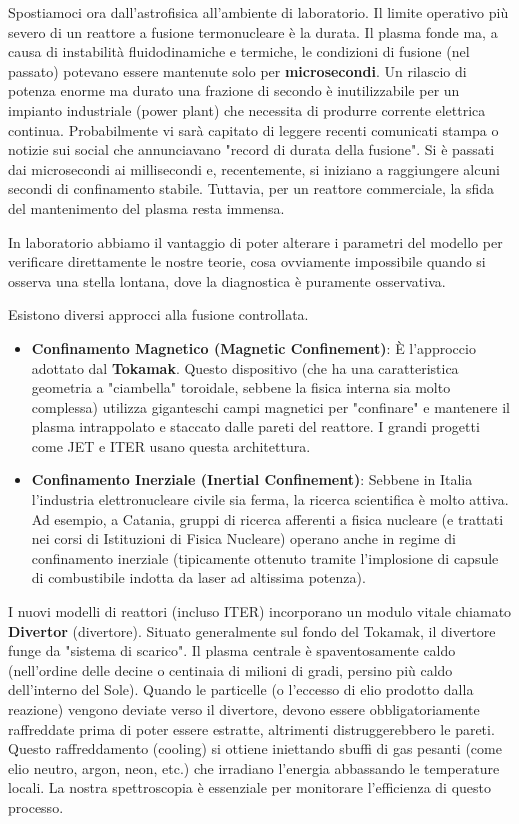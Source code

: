 Spostiamoci ora dall'astrofisica all'ambiente di laboratorio.
Il limite operativo più severo di un reattore a fusione termonucleare è la durata. Il plasma fonde ma, a causa di instabilità fluidodinamiche e termiche, le condizioni di fusione (nel passato) potevano essere mantenute solo per \textbf{microsecondi}.
Un rilascio di potenza enorme ma durato una frazione di secondo è inutilizzabile per un impianto industriale (power plant) che necessita di produrre corrente elettrica continua. Probabilmente vi sarà capitato di leggere recenti comunicati stampa o notizie sui social che annunciavano "record di durata della fusione". Si è passati dai microsecondi ai millisecondi e, recentemente, si iniziano a raggiungere alcuni secondi di confinamento stabile. Tuttavia, per un reattore commerciale, la sfida del mantenimento del plasma resta immensa.

In laboratorio abbiamo il vantaggio di poter alterare i parametri del modello per verificare direttamente le nostre teorie, cosa ovviamente impossibile quando si osserva una stella lontana, dove la diagnostica è puramente osservativa.

Esistono diversi approcci alla fusione controllata.

\begin{itemize}
    \item \textbf{Confinamento Magnetico (Magnetic Confinement)}: È l'approccio adottato dal \textbf{Tokamak}. Questo dispositivo (che ha una caratteristica geometria a "ciambella" toroidale, sebbene la fisica interna sia molto complessa) utilizza giganteschi campi magnetici per "confinare" e mantenere il plasma intrappolato e staccato dalle pareti del reattore. I grandi progetti come JET e ITER usano questa architettura.
    \item \textbf{Confinamento Inerziale (Inertial Confinement)}: Sebbene in Italia l'industria elettronucleare civile sia ferma, la ricerca scientifica è molto attiva. Ad esempio, a Catania, gruppi di ricerca afferenti a fisica nucleare (e trattati nei corsi di Istituzioni di Fisica Nucleare) operano anche in regime di confinamento inerziale (tipicamente ottenuto tramite l'implosione di capsule di combustibile indotta da laser ad altissima potenza).
\end{itemize}

I nuovi modelli di reattori (incluso ITER) incorporano un modulo vitale chiamato \textbf{Divertor} (divertore). Situato generalmente sul fondo del Tokamak, il divertore funge da "sistema di scarico". Il plasma centrale è spaventosamente caldo (nell'ordine delle decine o centinaia di milioni di gradi, persino più caldo dell'interno del Sole). Quando le particelle (o l'eccesso di elio prodotto dalla reazione) vengono deviate verso il divertore, devono essere obbligatoriamente raffreddate prima di poter essere estratte, altrimenti distruggerebbero le pareti. Questo raffreddamento (cooling) si ottiene iniettando sbuffi di gas pesanti (come elio neutro, argon, neon, etc.) che irradiano l'energia abbassando le temperature locali. La nostra spettroscopia è essenziale per monitorare l'efficienza di questo processo.

